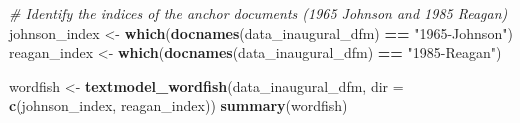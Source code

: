 \documentclass[
]{book}
\newenvironment{Shaded}{\begin{snugshade}}{\end{snugshade}}
\newcommand{\AttributeTok}[1]{\textcolor[rgb]{0.13,0.29,0.53}{#1}}
\newcommand{\CommentTok}[1]{\textcolor[rgb]{0.56,0.35,0.01}{\textit{#1}}}
\newcommand{\FunctionTok}[1]{\textcolor[rgb]{0.13,0.29,0.53}{\textbf{#1}}}
\newcommand{\NormalTok}[1]{#1}
\newcommand{\OtherTok}[1]{\textcolor[rgb]{0.56,0.35,0.01}{#1}}
\newcommand{\SpecialCharTok}[1]{\textcolor[rgb]{0.81,0.36,0.00}{\textbf{#1}}}
\newcommand{\StringTok}[1]{\textcolor[rgb]{0.31,0.60,0.02}{#1}}
\begin{document}
\begin{Shaded}
\begin{Highlighting}[]
\CommentTok{\# Identify the indices of the anchor documents (1965 Johnson and 1985 Reagan)}
\NormalTok{johnson\_index }\OtherTok{\textless{}{-}} \FunctionTok{which}\NormalTok{(}\FunctionTok{docnames}\NormalTok{(data\_inaugural\_dfm) }\SpecialCharTok{==} \StringTok{"1965{-}Johnson"}\NormalTok{)}
\NormalTok{reagan\_index }\OtherTok{\textless{}{-}} \FunctionTok{which}\NormalTok{(}\FunctionTok{docnames}\NormalTok{(data\_inaugural\_dfm) }\SpecialCharTok{==} \StringTok{"1985{-}Reagan"}\NormalTok{)}

\NormalTok{wordfish }\OtherTok{\textless{}{-}} \FunctionTok{textmodel\_wordfish}\NormalTok{(data\_inaugural\_dfm, }\AttributeTok{dir =} \FunctionTok{c}\NormalTok{(johnson\_index, reagan\_index))}
\FunctionTok{summary}\NormalTok{(wordfish)}
\end{Highlighting}
\end{Shaded}
\end{document}
